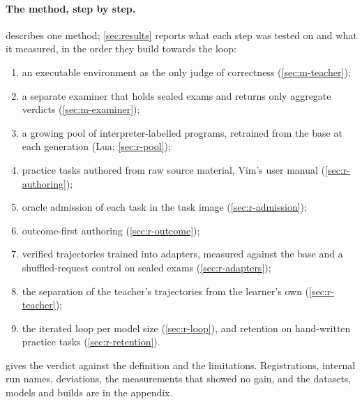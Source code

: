 \paragraph{The method, step by step.}  describes one method; \cref{sec:results} reports what each step was
tested on and what it measured, in the order they build towards the loop:
\begin{enumerate}
\item an executable environment as the only judge of correctness (\cref{sec:m-teacher});
\item a separate examiner that holds sealed exams and returns only aggregate verdicts (\cref{sec:m-examiner});
\item a growing pool of interpreter-labelled programs, retrained from the base at each generation (Lua; \cref{sec:r-pool});
\item practice tasks authored from raw source material, Vim's user manual (\cref{sec:r-authoring});
\item oracle admission of each task in the task image (\cref{sec:r-admission});
\item outcome-first authoring (\cref{sec:r-outcome});
\item verified trajectories trained into adapters, measured against the base and a shuffled-request control on sealed exams
  (\cref{sec:r-adapters});
\item the separation of the teacher's trajectories from the learner's own (\cref{sec:r-teacher});
\item the iterated loop per model size (\cref{sec:r-loop}), and retention on hand-written practice tasks
  (\cref{sec:r-retention}).
\end{enumerate}
 gives the verdict against the definition and the limitations. Registrations, internal run names,
deviations, the measurements that showed no gain, and the datasets, models and builds are in the appendix.

